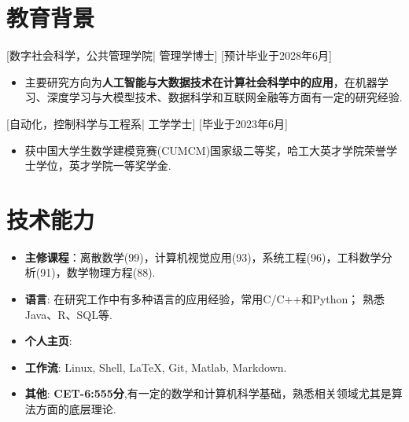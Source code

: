 \documentclass{resume}
\begin{document}



\ResumeTitle

\vspace{0.5cm}
\section{\textbf{教育背景}}
[\textnormal{数字社会科学，公共管理学院|} 管理学博士]
[预计毕业于2028年6月]
\begin{itemize}
    \item 主要研究方向为\textbf{人工智能与大数据技术在计算社会科学中的应用}，在机器学习、深度学习与大模型技术、数据科学和互联网金融等方面有一定的研究经验.
\end{itemize}

[\textnormal{自动化，控制科学与工程系|} 工学学士]
[毕业于2023年6月]
\begin{itemize}
    \item 获中国大学生数学建模竞赛(CUMCM)国家级二等奖，哈工大英才学院荣誉学士学位，英才学院一等奖学金.
\end{itemize}


\section[技术能力]{\textbf{技术能力}}
\begin{itemize}
\item \textbf{主修课程}：离散数学(99)，计算机视觉应用(93)，系统工程(96)，工科数学分析(91)，数学物理方程(88).
  \item \textbf{语言}: 在研究工作中有多种语言的应用经验，常用C/C++和Python； 熟悉 Java、R、SQL等.
  \item \textbf{个人主页}: 
  \item \textbf{工作流}: Linux, Shell, LaTeX, Git, Matlab, Markdown.
  \item \textbf{其他}: \textbf{CET-6:555分},有一定的数学和计算机科学基础，熟悉相关领域尤其是算法方面的底层理论.
\end{itemize}
\end{document}
